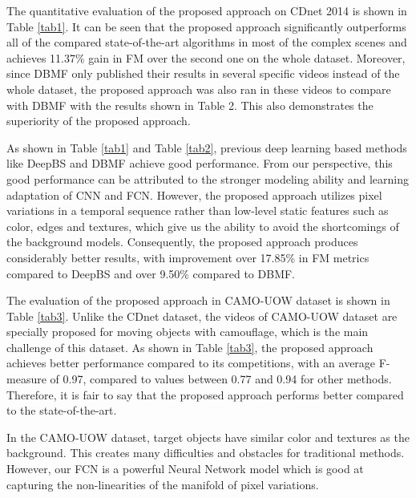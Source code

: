 \documentclass[journal]{IEEEtran}
\newcommand{\reftab}[1]{Table \ref{#1}}
\begin{document}
The quantitative evaluation of the proposed approach on CDnet 2014 is shown in \reftab{tab1}. 
It can be seen that the proposed approach significantly outperforms all of the compared state-of-the-art algorithms in most of the complex scenes and achieves 11.37\% gain in FM over the second one on the whole dataset. 
%
Moreover,
since DBMF only published their results in several specific videos instead of the whole dataset,
the proposed approach was also ran in these videos to compare with DBMF with the results shown in Table 2.
This also demonstrates the superiority of the proposed approach.

As shown in \reftab{tab1} and \reftab{tab2}, previous deep learning based methods like DeepBS and DBMF achieve good performance. 
From our perspective, this good performance can be attributed to the stronger modeling ability and learning adaptation of CNN and FCN. 
However, the proposed approach utilizes pixel variations in a temporal sequence rather than low-level static features such as color, edges and textures, which give us the ability to avoid the shortcomings of the background models. 
Consequently, the proposed approach produces considerably better results, with improvement over 17.85\% in FM metrics compared to DeepBS and over 9.50\% compared to DBMF.

The evaluation of the proposed approach in CAMO-UOW dataset is shown in \reftab{tab3}. 
Unlike the CDnet dataset, the videos of CAMO-UOW dataset are specially proposed for moving objects with camouflage, which is the main challenge of this dataset. 
As shown in \reftab{tab3}, the proposed approach achieves better performance compared to its competitions, 
with an average F-measure of 0.97, compared to values between 0.77 and 0.94 for other methods. 
Therefore, it is fair to say that the proposed approach performs better compared to the state-of-the-art.


In the CAMO-UOW dataset, target objects have similar color and textures as the background. This creates many difficulties and obstacles for traditional methods. 
However, our FCN is a powerful Neural Network model which is good at capturing the non-linearities of the manifold of pixel variations. 
\end{document}

